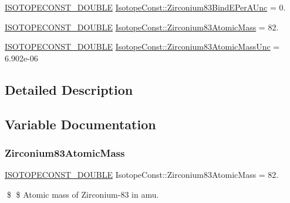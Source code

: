 \begin{DoxyCompactItemize}
\mbox{\hyperlink{group___isotope_const-_macros_ga8f45a7272ce02c0b4c65c44636ed719a}{I\+S\+O\+T\+O\+P\+E\+C\+O\+N\+S\+T\+\_\+\+D\+O\+U\+B\+LE}} \mbox{\hyperlink{group___isotope_const-_zirconium-_zr83_ga0b81c26ed40d51b4bd9f6b6169c7d0ed}{Isotope\+Const\+::\+Zirconium83\+Bind\+E\+Per\+A\+Unc}} = 0.
\item 
\mbox{\hyperlink{group___isotope_const-_macros_ga8f45a7272ce02c0b4c65c44636ed719a}{I\+S\+O\+T\+O\+P\+E\+C\+O\+N\+S\+T\+\_\+\+D\+O\+U\+B\+LE}} \mbox{\hyperlink{group___isotope_const-_zirconium-_zr83_ga7ca99abc6d652bc580320539a91748a5}{Isotope\+Const\+::\+Zirconium83\+Atomic\+Mass}} = 82.
\item 
\mbox{\hyperlink{group___isotope_const-_macros_ga8f45a7272ce02c0b4c65c44636ed719a}{I\+S\+O\+T\+O\+P\+E\+C\+O\+N\+S\+T\+\_\+\+D\+O\+U\+B\+LE}} \mbox{\hyperlink{group___isotope_const-_zirconium-_zr83_ga012c68762bca32fc1b7ff04761c4c0f1}{Isotope\+Const\+::\+Zirconium83\+Atomic\+Mass\+Unc}} = 6.\+902e-\/06
\end{DoxyCompactItemize}


\subsection{Detailed Description}


\subsection{Variable Documentation}
\mbox{\label{group___isotope_const-_zirconium-_zr83_ga7ca99abc6d652bc580320539a91748a5}} 
\subsubsection{\texorpdfstring{Zirconium83\+Atomic\+Mass}{Zirconium83AtomicMass}}
{\footnotesize\ttfamily \mbox{\hyperlink{group___isotope_const-_macros_ga8f45a7272ce02c0b4c65c44636ed719a}{I\+S\+O\+T\+O\+P\+E\+C\+O\+N\+S\+T\+\_\+\+D\+O\+U\+B\+LE}} Isotope\+Const\+::\+Zirconium83\+Atomic\+Mass = 82.}

\$ \$ Atomic mass of Zirconium-\/83 in amu. \mbox{\label{group___isotope_const-_zirconium-_zr83_ga012c68762bca32fc1b7ff04761c4c0f1}} 
